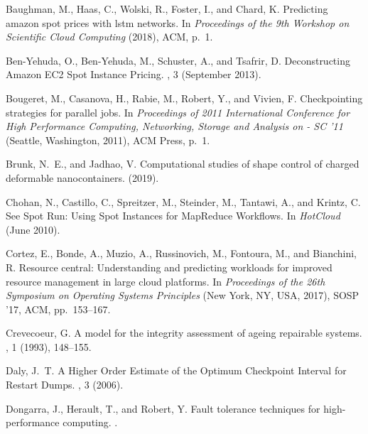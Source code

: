 \documentclass[sigconf]{acmart} %
\begin{document}
\begin{thebibliography}{10}
{\sc Baughman, M., Haas, C., Wolski, R., Foster, I., and Chard, K.}
\newblock Predicting amazon spot prices with lstm networks.
\newblock In {\em Proceedings of the 9th Workshop on Scientific Cloud
  Computing\/} (2018), ACM, p.~1.

{\sc Ben-Yehuda, O., Ben-Yehuda, M., Schuster, A., and Tsafrir, D.}
\newblock Deconstructing {A}mazon {E}{C}2 {S}pot {I}nstance {P}ricing.
, 3 (September 2013).

{\sc Bougeret, M., Casanova, H., Rabie, M., Robert, Y., and Vivien, F.}
\newblock Checkpointing strategies for parallel jobs.
\newblock In {\em Proceedings of 2011 {International} {Conference} for {High}
  {Performance} {Computing}, {Networking}, {Storage} and {Analysis} on - {SC}
  '11\/} (Seattle, Washington, 2011), ACM Press, p.~1.

{\sc Brunk, N.~E., and Jadhao, V.}
\newblock Computational studies of shape control of charged deformable
  nanocontainers.
 (2019).

{\sc Chohan, N., Castillo, C., Spreitzer, M., Steinder, M., Tantawi, A., and
  Krintz, C.}
\newblock See {S}pot {R}un: {U}sing {S}pot {I}nstances for {M}ap{R}educe
  {W}orkflows.
\newblock In {\em HotCloud\/} (June 2010).

{\sc Cortez, E., Bonde, A., Muzio, A., Russinovich, M., Fontoura, M., and
  Bianchini, R.}
\newblock Resource central: Understanding and predicting workloads for improved
  resource management in large cloud platforms.
\newblock In {\em Proceedings of the 26th Symposium on Operating Systems
  Principles\/} (New York, NY, USA, 2017), SOSP '17, ACM, pp.~153--167.

{\sc Crevecoeur, G.}
\newblock A model for the integrity assessment of ageing repairable systems.
, 1 (1993), 148--155.

{\sc Daly, J.~T.}
\newblock A {H}igher {O}rder {E}stimate of the {O}ptimum {C}heckpoint
  {I}nterval for {R}estart {D}umps.
, 3 (2006).

{\sc Dongarra, J., Herault, T., and Robert, Y.}
\newblock Fault tolerance techniques for high-performance computing.
.


\end{thebibliography}
\end{document}
